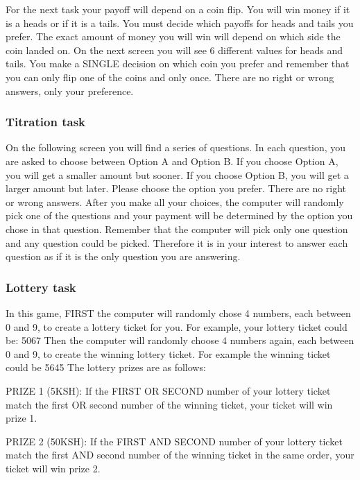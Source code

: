 \documentclass[11pt]{article}
\begin{document}
            For the next task your payoff will depend on a coin flip.  You will win money if it is a heads or if it is a tails.  You must decide which payoffs for heads and tails you prefer. The exact amount of money you will win will depend on which side the coin landed on. On the next screen you will see 6 different values for heads and tails. You make a SINGLE decision on which coin you prefer and remember that you can only flip one of the coins and only once. There are no right or wrong answers, only your preference.

        \subsubsection{Titration task}

            On the following screen you will find a series of questions. In each question, you are asked to choose between Option A and Option B. If you choose Option A, you will get a smaller amount but sooner. If you choose Option B, you will get a larger amount but later. Please choose the option you prefer. There are no right or wrong answers. After you make all your choices, the computer will randomly pick one of the questions and your payment will be determined by the option you chose in that question. Remember that the computer will pick only one question and any question could be picked. Therefore it is in your interest to answer each question as if it is the only question you are answering.

        \subsubsection{Lottery task}

            In this game, FIRST the computer will randomly chose 4 numbers, each between 0 and 9, to create a lottery ticket for you. For example, your lottery ticket could be: 5067 Then the computer will randomly choose 4 numbers again, each between 0 and 9, to create the winning lottery ticket. For example the winning ticket could be 5645 The lottery prizes are as follows:

            PRIZE 1 (5KSH): If the FIRST OR SECOND number of your lottery ticket match the first OR second number of the winning ticket, your ticket will win prize 1.

            PRIZE 2 (50KSH): If the FIRST AND SECOND number of your lottery ticket match the first AND second number of the winning ticket in the same order, your ticket will win prize 2.
\end{document}
